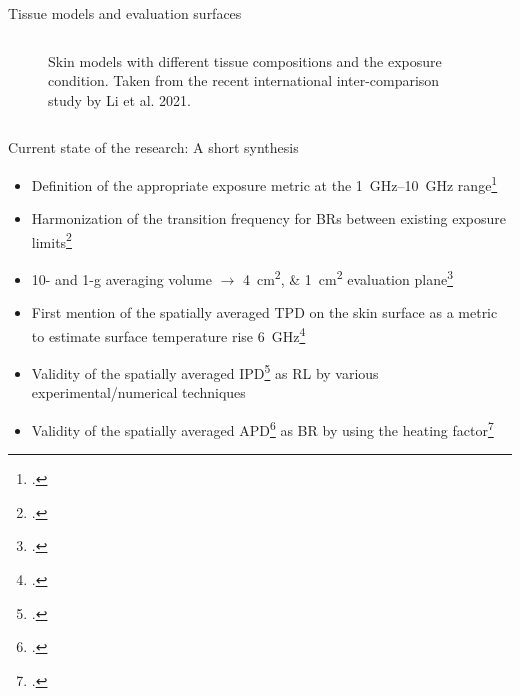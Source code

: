 \documentclass[xcolor=dvipsnames,10pt]{beamer}
\begin{document}
\begin{frame}{Tissue models and evaluation surfaces}
\begin{columns}[c]
\begin{column}{0.5\textwidth}
\begin{center}
\begin{figure}
                \caption{Skin models with different tissue compositions and the exposure condition. Taken from the recent international inter-comparison study by Li et al. 2021.}
            \end{figure}
            \end{center}
        \end{column}
    \end{columns}
\end{frame}

\begin{frame}{Current state of the research: A short synthesis}
    \begin{itemize}
        \item Definition of the appropriate exposure metric at the \SIrange[]{1}{10}{\GHz} range\footcite{Anderson2010SAR,McIntosh2010SAR}
        \item Harmonization of the transition frequency for BRs between existing exposure limits\footcite{Colombi2015Implications,Thors2016Exposure,Xu2017Understanding}
        \item 10- and 1-g averaging volume $\rightarrow$ \SIlist{4;1}{\cm\squared} evaluation plane\footcite{Hashimoto2017averaging,Funahashi2018Averaging,Foster2016Thermal,Foster2017Thermal}
        \item First mention of the spatially averaged TPD on the skin surface as a metric to estimate surface temperature rise \SI{6}{\GHz}\footcite{Funahashi2018Area-averaged}
        \item Validity of the spatially averaged IPD\footcite{Sasaki2017Monte,Li2019Relationship,He2018RF,Diao2021Effect,Carrasco2019Exposure,Miura2021Power,Nakae2020Skin,Morimoto2022Assessment,DeSantis2022On} as RL by various experimental/numerical techniques
        \item Validity of the spatially averaged APD\footcite{Li2021Quantitative,Taguchi2022Computation,Li2023Calculated} as BR by using the heating factor\footcite{Foster2018Modeling}
    \end{itemize}
\end{frame}
\end{document}
